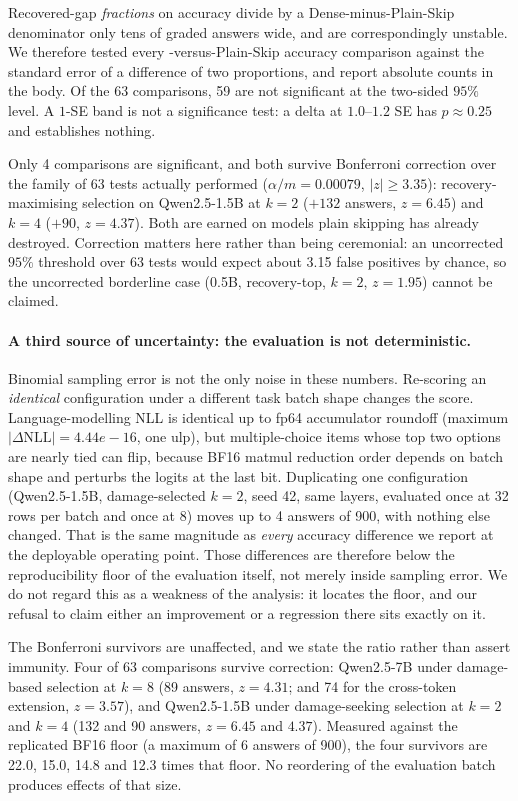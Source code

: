 Recovered-gap \emph{fractions} on accuracy divide by a Dense-minus-Plain-Skip denominator
only tens of graded answers wide, and are correspondingly unstable. We therefore tested
every \mname-versus-Plain-Skip accuracy comparison against the standard error of a
difference of two proportions, and report absolute counts in the body. Of the 63
comparisons, 59 are not significant at the two-sided $95\%$ level. A $1$-SE band is
not a significance test: a delta at $1.0$--$1.2$ SE has $p \approx 0.25$ and establishes
nothing.

Only 4 comparisons are significant, and both survive Bonferroni correction over the
family of 63 tests actually performed ($\alpha/m = 0.00079$, $|z| \ge
3.35$): recovery-maximising selection on Qwen2.5-1.5B at $k=2$
($+132$ answers, $z=6.45$) and $k=4$ ($+90$, $z=4.37$). Both are
earned on models plain skipping has already destroyed. Correction matters here rather
than being ceremonial: an uncorrected $95\%$ threshold over 63 tests would expect
about 3.15 false positives by chance, so the uncorrected borderline case
(0.5B, recovery-top, $k=2$, $z=1.95$) cannot be claimed.

\paragraph{A third source of uncertainty: the evaluation is not deterministic.} Binomial
sampling error is not the only noise in these numbers. Re-scoring an \emph{identical}
configuration under a different task batch shape changes the score. Language-modelling NLL is
identical up to fp64 accumulator roundoff (maximum $|\Delta\mathrm{NLL}| =
4.44e-16$, one ulp), but multiple-choice items whose top two options are nearly tied can
flip, because BF16 matmul reduction order depends on batch shape and perturbs the logits at
the last bit. Duplicating one configuration (Qwen2.5-1.5B, damage-selected $k=2$,
seed 42, same layers, evaluated once at 32 rows per batch and once at 8) moves up
to 4 answers of 900, with nothing else changed. That is the same magnitude as
\emph{every} accuracy difference we report at the deployable operating point. Those
differences are therefore below the reproducibility floor of the evaluation itself, not merely
inside sampling error. We do not regard this as a weakness of the analysis: it locates the
floor, and our refusal to claim either an improvement or a regression there sits exactly on
it.

The Bonferroni survivors are unaffected, and we state the ratio rather than assert immunity.
Four of 63 comparisons survive correction: Qwen2.5-7B under damage-based selection at
$k=8$ (89 answers, $z=4.31$; and 74 for the cross-token extension,
$z=3.57$), and Qwen2.5-1.5B under damage-seeking selection at $k=2$ and $k=4$
(132 and 90 answers, $z=6.45$ and $4.37$). Measured against the replicated BF16 floor (a maximum of 6
answers of 900), the four survivors are 22.0, 15.0, 14.8 and 12.3 times that floor. No
reordering of the evaluation batch produces effects of that size.

